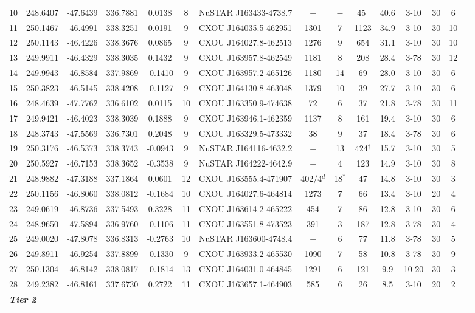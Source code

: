 \documentclass[iop,revtex4]{emulateapj}
\newcommand\T{\rule{0pt}{2.6ex}}       %
\newcommand\M{\rule{0pt}{2.3ex}}
\begin{document}
\begin{landscape}
{\begin{longtable}{ccccccccccccccl}
\M 10&248.6407&-47.6439&336.7881&0.0138&8&NuSTAR J163433-4738.7&$-$&$-$&45$^{\dag}$&40.6&3-10&30&6\\
\M 11&250.1467&-46.4991&338.3251&0.0191&9&CXOU J164035.5-462951&1301&7&1123&34.9&3-10&30&10\\
\M 12&250.1143&-46.4226&338.3676&0.0865&9&CXOU J164027.8-462513&1276&9&654&31.1&3-10&30&10\\
\M 13&249.9911&-46.4329&338.3035&0.1432&9&CXOU J163957.8-462549&1181&8&208&28.4&3-78&30&12\\
\M 14&249.9943&-46.8584&337.9869&-0.1410&9&CXOU J163957.2-465126&1180&14&69&28.0&3-10&30&6\\
\M 15&250.3823&-46.5145&338.4208&-0.1127&9&CXOU J164130.8-463048&1379&10&39&27.7&3-10&30&6\\
\M 16&248.4639&-47.7762&336.6102&0.0115&10&CXOU J163350.9-474638&72&6&37&21.8&3-78&30&11\\
\M 17&249.9421&-46.4023&338.3039&0.1888&9&CXOU J163946.1-462359&1137&8&161&19.4&3-10&30&6\\
\M 18&248.3743&-47.5569&336.7301&0.2048&9&CXOU J163329.5-473332&38&9&37&18.4&3-78&30&6\\
\M 19&250.3176&-46.5373&338.3743&-0.0943&9&NuSTAR J164116-4632.2&$-$&13&424$^{\dag}$&15.7&3-10&30&5\\
\M 20&250.5927&-46.7153&338.3652&-0.3538&9&NuSTAR J164222-4642.9&$-$&4&123&14.9&3-10&30&8\\
\M 21&248.9882&-47.3188&337.1864&0.0601&12&CXOU J163555.4-471907&402/4$^d$&18$^*$&47&14.8&3-10&30&3\\
\M 22&250.1156&-46.8060&338.0812&-0.1684&10&CXOU J164027.6-464814&1273&7&66&13.4&3-10&20&4\\
\M 23&249.0619&-46.8736&337.5493&0.3228&11&CXOU J163614.2-465222&454&7&86&12.8&3-10&30&6\\
\M 24&248.9650&-47.5894&336.9760&-0.1106&11&CXOU J163551.8-473523&391&3&187&12.8&3-78&30&4\\
\M 25&249.0020&-47.8078&336.8313&-0.2763&10&NuSTAR J163600-4748.4&$-$&6&77&11.8&3-78&30&5\\
\M 26&249.8911&-46.9254&337.8899&-0.1330&9&CXOU J163933.2-465530&1090&7&58&10.8&3-78&30&9\\
\M 27&250.1304&-46.8142&338.0817&-0.1814&13&CXOU J164031.0-464845&1291&6&121&9.9&10-20&30&3\\
\M 28&249.2382&-46.8161&337.6730&0.2722&11&CXOU J163657.1-464903&585&6&26&8.5&3-10&20&2\\
\multicolumn{2}{l}{\textbf{\textit{Tier 2}}} &&&&&&&&&&&&\T\\

\end{longtable}}
\end{landscape}
\end{document}
